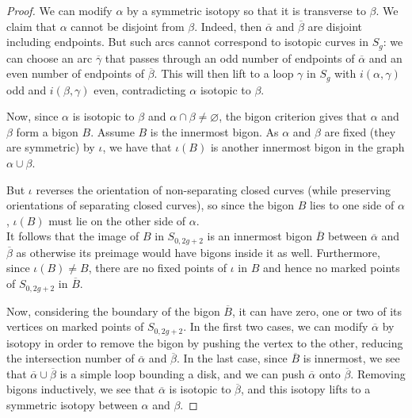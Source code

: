 \documentclass[reqno]{amsart}
\theoremstyle{definition}
\theoremstyle{remark}
\begin{document}
\begin{proof}
       We can modify $\alpha$ by a symmetric
       isotopy so that it is transverse to $\beta$.
       We claim that $\alpha$ cannot be
       disjoint from $\beta$. Indeed,
       then $\overline{\alpha}$ and $\overline{\beta}$ 
       are disjoint including endpoints. But
       such arcs cannot correspond
       to isotopic curves in $S_g$: we can choose
       an arc $\overline{\gamma}$ that passes through
        an odd number of endpoints of
        $\overline{\alpha}$ and
        an even number of endpoints of $\overline{\beta}$.
        This will then lift to a loop
        $\gamma$ in $S_g$ with
        $i \left( \alpha, \gamma \right) $ odd
        and $i \left( \beta, \gamma \right) $ even, contradicting
        $\alpha$ isotopic to $\beta$.

        Now, since $\alpha$ is isotopic to $\beta$ and
        $\alpha \cap \beta \neq \varnothing$, the bigon
        criterion gives that
        $\alpha$ and $\beta$ form a bigon $B$. Assume
        $B$ is the innermost bigon. As
        $\alpha$ and $\beta$ are fixed (they are symmetric) by
        $\iota$, we have that $\iota (B)$ is another
        innermost bigon in the graph
        $\alpha \cup \beta$.

        But $\iota$ reverses the orientation of non-separating
        closed curves (while preserving orientations
        of separating closed curves), so
        since the bigon $B$ lies to one side of $\alpha$,
        $\iota(B)$ must lie on the other side of $\alpha$.\\
        \linebreak
        It follows that the image of 
        $B$ in $S_{0,2g+2}$ is an innermost bigon $\overline{B}$ 
        between $\overline{\alpha}$ and $\overline{\beta}$ as
        otherwise its preimage would have bigons inside it
        as well.
        Furthermore, since $\iota (B) \neq B$, there are
        no fixed points of $\iota$ in $B$ and hence
        no marked points of
        $S_{0,2g+2}$ in $\overline{B}$.

        Now, considering the boundary of the bigon $\overline{B}$,
        it can have zero, one or two of its vertices on
        marked points of $S_{0,2g+2}$. In the first two cases,
        we can modify $\overline{\alpha}$ by isotopy
        in order to remove the bigon by pushing the
        vertex to the other, reducing the intersection
        number of $\overline{\alpha}$ and $\overline{\beta}$.
        In the last case, since $\overline{B}$ is innermost,
        we see that $\overline{\alpha} \cup 
        \overline{\beta}$ is a simple loop bounding
        a disk, and we can push $\overline{\alpha}$ onto
        $\overline{\beta}$. Removing bigons inductively,
        we see that $\overline{\alpha}$ is isotopic
        to $\overline{\beta}$, and this isotopy lifts to a
        symmetric isotopy between $\alpha$ and $\beta$.
   \end{proof}
\end{document}
